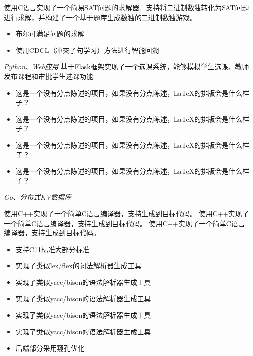 \documentclass{uniquecv}
\begin{document}
使用C语言实现了一个简易SAT问题的求解器，支持将二进制数独转化为SAT问题进行求解，并构建了一个基于题库生成数独的二进制数独游戏。
\begin{itemize}
  \item 布尔可满足问题的求解
  \item 使用CDCL（冲突子句学习）方法进行智能回溯
\end{itemize}
\medskip
\textit{Python、Web应用}
\vspace{0.4ex}
基于Flask框架实现了一个选课系统，能够模拟学生选课、教师发布课程和审批学生选课功能
\begin{itemize}
\item 这是一个没有分点陈述的项目，如果没有分点陈述，LaTeX的排版会是什么样子？
\item 这是一个没有分点陈述的项目，如果没有分点陈述，LaTeX的排版会是什么样子？
\item 这是一个没有分点陈述的项目，如果没有分点陈述，LaTeX的排版会是什么样子？
\item 这是一个没有分点陈述的项目，如果没有分点陈述，LaTeX的排版会是什么样子？
\end{itemize}
\medskip
\textit{Go、分布式KV数据库}
\vspace{0.4ex}

使用C++实现了一个简单C语言编译器，支持生成到目标代码。
使用C++实现了一个简单C语言编译器，支持生成到目标代码。
使用C++实现了一个简单C语言编译器，支持生成到目标代码。
\begin{itemize}
  \item 支持C11标准大部分标准
  \item 实现了类似lex/flex的词法解析器生成工具
  \item 实现了类似yacc/bison的语法解析器生成工具
  \item 实现了类似yacc/bison的语法解析器生成工具
  \item 实现了类似yacc/bison的语法解析器生成工具
  \item 实现了类似yacc/bison的语法解析器生成工具
  \item 后端部分采用窥孔优化
\end{itemize}


\end{document}
